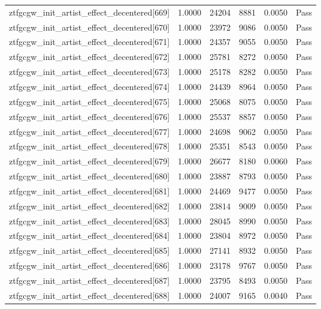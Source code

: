 \begin{table}[htbp]
\begin{tabular}{llrrll}
ztfgcgw\_init\_artist\_effect\_decentered[669] & 1.0000 & 24204 & 8881 & 0.0050 & Pass \\
ztfgcgw\_init\_artist\_effect\_decentered[670] & 1.0000 & 23972 & 9086 & 0.0050 & Pass \\
ztfgcgw\_init\_artist\_effect\_decentered[671] & 1.0000 & 24357 & 9055 & 0.0050 & Pass \\
ztfgcgw\_init\_artist\_effect\_decentered[672] & 1.0000 & 25781 & 8272 & 0.0050 & Pass \\
ztfgcgw\_init\_artist\_effect\_decentered[673] & 1.0000 & 25178 & 8282 & 0.0050 & Pass \\
ztfgcgw\_init\_artist\_effect\_decentered[674] & 1.0000 & 24439 & 8964 & 0.0050 & Pass \\
ztfgcgw\_init\_artist\_effect\_decentered[675] & 1.0000 & 25068 & 8075 & 0.0050 & Pass \\
ztfgcgw\_init\_artist\_effect\_decentered[676] & 1.0000 & 25537 & 8857 & 0.0050 & Pass \\
ztfgcgw\_init\_artist\_effect\_decentered[677] & 1.0000 & 24698 & 9062 & 0.0050 & Pass \\
ztfgcgw\_init\_artist\_effect\_decentered[678] & 1.0000 & 25351 & 8543 & 0.0050 & Pass \\
ztfgcgw\_init\_artist\_effect\_decentered[679] & 1.0000 & 26677 & 8180 & 0.0060 & Pass \\
ztfgcgw\_init\_artist\_effect\_decentered[680] & 1.0000 & 23887 & 8793 & 0.0050 & Pass \\
ztfgcgw\_init\_artist\_effect\_decentered[681] & 1.0000 & 24469 & 9477 & 0.0050 & Pass \\
ztfgcgw\_init\_artist\_effect\_decentered[682] & 1.0000 & 23814 & 9009 & 0.0050 & Pass \\
ztfgcgw\_init\_artist\_effect\_decentered[683] & 1.0000 & 28045 & 8990 & 0.0050 & Pass \\
ztfgcgw\_init\_artist\_effect\_decentered[684] & 1.0000 & 23804 & 8972 & 0.0050 & Pass \\
ztfgcgw\_init\_artist\_effect\_decentered[685] & 1.0000 & 27141 & 8932 & 0.0050 & Pass \\
ztfgcgw\_init\_artist\_effect\_decentered[686] & 1.0000 & 23178 & 9767 & 0.0050 & Pass \\
ztfgcgw\_init\_artist\_effect\_decentered[687] & 1.0000 & 23795 & 8493 & 0.0050 & Pass \\
ztfgcgw\_init\_artist\_effect\_decentered[688] & 1.0000 & 24007 & 9165 & 0.0040 & Pass \\

\end{tabular}
\end{table}
